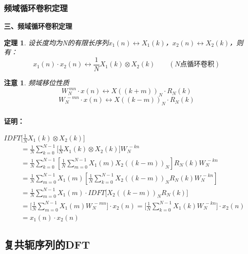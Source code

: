 \documentclass[notheorems,compress,mathserif,table]{beamer}
\newtheorem{theorem}{定理}
\newtheorem{zhuyi}{注意}
\begin{document}
\begin{frame}[shrink]\frametitle{频域循环卷积定理}%
\textbf{三、频域循环卷积定理}
\begin{theorem}
设长度均为N的有限长序列$x_1(n)\leftrightarrow X_1(k)$，$x_2(n)\leftrightarrow X_2(k)$，则有：
$$x_1(n)\cdot x_2(n)\longleftrightarrow\frac{1}{N}X_1(k)\otimes X_2(k)\quad\quad(\mbox{$N$点循环卷积})$$
\end{theorem}
\begin{zhuyi}
频域移位性质
$$W_N^{\:mn}\cdot x(n) \longleftrightarrow X((k+m))_N\cdot R_N(k)$$
$$W_N^{\:-mn}\cdot x(n) \longleftrightarrow X((k-m))_N\cdot R_N(k) $$
\end{zhuyi}

\end{frame}





\begin{frame}[shrink]\frametitle{}%
\textbf{证明：}

$IDFT\big[ \frac{1}{N}X_1(k) \otimes X_2(k)\big]$
\begin{equation*}
\begin{split}
    \quad
         &= \frac{1}{N}\sum_{k=0}^{N-1}\bigg[ \frac{1}{N}X_1(k) \otimes X_2(k) \bigg]W_N^{\:-kn} \\
         &= \frac{1}{N}\sum_{k=0}^{N-1}\left[\frac{1}{N}\sum_{m=0}^{N-1}X_1(m) X_2((k-m))_N \right] R_N(k) W_N^{\:-kn}   \\
         &= \frac{1}{N}\sum_{m=0}^{N-1}X_1(m)\left[ \frac{1}{N}\sum_{k=0}^{N-1} X_2((k-m))_N R_N(k) W_N^{\:-kn} \right]   \\
         &= \frac{1}{N}\sum_{m=0}^{N-1}X_1(m)\cdot IDFT\Big[  X_2((k-m))_N R_N(k) \Big]  \quad \\
         &= \Bigg[\frac{1}{N}\sum_{m=0}^{N-1} X_1(m)W_N^{\:-mn}\Bigg] \cdot x_2(n)  = \Bigg[\frac{1}{N}\sum_{k=0}^{N-1} X_1(k)W_N^{\:-kn}\Bigg] \cdot x_2(n)  \\
         &= x_1(n)\cdot x_2(n)
\end{split}
\end{equation*}

\end{frame}
%
\subsection{复共轭序列的DFT}
\end{document}
